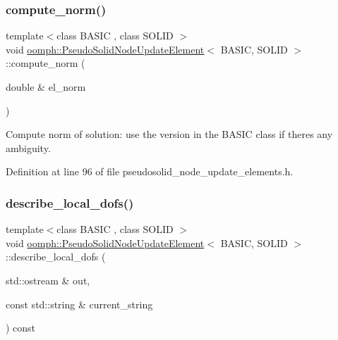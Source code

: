\subsubsection{\texorpdfstring{compute\+\_\+norm()}{compute\_norm()}}
{\footnotesize\ttfamily template$<$class B\+A\+S\+IC , class S\+O\+L\+ID $>$ \\
void \hyperlink{classoomph_1_1PseudoSolidNodeUpdateElement}{oomph\+::\+Pseudo\+Solid\+Node\+Update\+Element}$<$ B\+A\+S\+IC, S\+O\+L\+ID $>$\+::compute\+\_\+norm (\begin{DoxyParamCaption}\item[{double \&}]{el\+\_\+norm }\end{DoxyParamCaption})\hspace{0.3cm}{\ttfamily [inline]}}



Compute norm of solution\+: use the version in the B\+A\+S\+IC class if there\textquotesingle{}s any ambiguity. 



Definition at line 96 of file pseudosolid\+\_\+node\+\_\+update\+\_\+elements.\+h.

\mbox{\label{classoomph_1_1PseudoSolidNodeUpdateElement_a1736af22476b283ee75d4626ec1b0c7e}} 
\subsubsection{\texorpdfstring{describe\+\_\+local\+\_\+dofs()}{describe\_local\_dofs()}}
{\footnotesize\ttfamily template$<$class B\+A\+S\+IC , class S\+O\+L\+ID $>$ \\
void \hyperlink{classoomph_1_1PseudoSolidNodeUpdateElement}{oomph\+::\+Pseudo\+Solid\+Node\+Update\+Element}$<$ B\+A\+S\+IC, S\+O\+L\+ID $>$\+::describe\+\_\+local\+\_\+dofs (\begin{DoxyParamCaption}\item[{std\+::ostream \&}]{out,  }\item[{const std\+::string \&}]{current\+\_\+string }\end{DoxyParamCaption}) const\hspace{0.3cm}{\ttfamily [inline]}}



